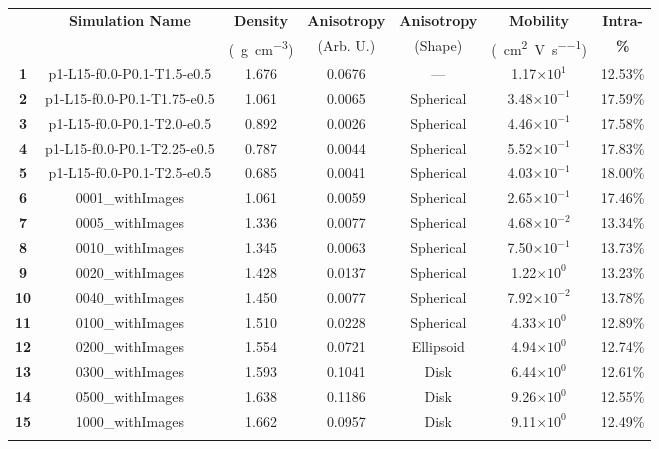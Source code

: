\documentclass[12pt]{article}
\def\mobunits{\square\centi\meter\per\volt\per\second}
\def\gcm{\gram\per\cubic\centi\meter}
\def\ccg{\cellcolor{gray}}
\begin{document}
\begin{center}
\begin{tabular}{| c | c | c | c | c | c | c |}
\hline
\rule{0pt}{2.5ex} 
\multirow{2}{*}{\textbf{ID}}&\multirow{2}{*}{\textbf{Simulation Name}}&\textbf{Density}&\textbf{Anisotropy}&\textbf{Anisotropy}&\textbf{Mobility}&\textbf{Intra-}\\
                            &&(\SI{}{\gcm})&(Arb. U.)&(Shape)&(\SI{}{\mobunits})&\textbf{\%}\\
\hhline{|=======|}
\textbf{\ccg1}&\rule{0pt}{2.5ex}\ccg p1-L15-f0.0-P0.1-T1.5-e0.5&\ccg 1.676&\ccg 0.0676&\ccg ---&\ccg1.17$\times 10^{1}$&\ccg12.53\%\\
\textbf{2}&\rule{0pt}{2.5ex}p1-L15-f0.0-P0.1-T1.75-e0.5&1.061&0.0065&Spherical&3.48$\times 10^{-1}$&17.59\%\\
\textbf{\ccg3}&\rule{0pt}{2.5ex}\ccg p1-L15-f0.0-P0.1-T2.0-e0.5&\ccg 0.892&\ccg 0.0026&\ccg Spherical&\ccg4.46$\times 10^{-1}$&\ccg17.58\%\\
\textbf{4}&\rule{0pt}{2.5ex}p1-L15-f0.0-P0.1-T2.25-e0.5&0.787&0.0044&Spherical&5.52$\times 10^{-1}$&17.83\%\\
\textbf{\ccg5}&\rule{0pt}{2.5ex}\ccg p1-L15-f0.0-P0.1-T2.5-e0.5&\ccg 0.685&\ccg 0.0041&\ccg Spherical&\ccg4.03$\times 10^{-1}$&\ccg18.00\%\\
\hhline{|=======|}
\textbf{\ccg6}&\rule{0pt}{2.5ex}\ccg 0001\_withImages&\ccg 1.061&\ccg 0.0059&\ccg Spherical&\ccg2.65$\times 10^{-1}$&\ccg17.46\%\\
\textbf{7}&\rule{0pt}{2.5ex}0005\_withImages&1.336&0.0077&Spherical&4.68$\times 10^{-2}$&13.34\%\\
\textbf{\ccg8}&\rule{0pt}{2.5ex}\ccg 0010\_withImages&\ccg 1.345&\ccg 0.0063&\ccg Spherical&\ccg7.50$\times 10^{-1}$&\ccg13.73\%\\
\textbf{9}&\rule{0pt}{2.5ex}0020\_withImages&1.428&0.0137&Spherical&1.22$\times 10^{0}$&13.23\%\\
\textbf{\ccg10}&\rule{0pt}{2.5ex}\ccg 0040\_withImages&\ccg 1.450&\ccg 0.0077&\ccg Spherical&\ccg7.92$\times 10^{-2}$&\ccg13.78\%\\
\textbf{11}&\rule{0pt}{2.5ex}0100\_withImages&1.510&0.0228&Spherical&4.33$\times 10^{0}$&12.89\%\\
\textbf{\ccg12}&\rule{0pt}{2.5ex}\ccg 0200\_withImages&\ccg 1.554&\ccg 0.0721&\ccg Ellipsoid&\ccg4.94$\times 10^{0}$&\ccg12.74\%\\
\textbf{13}&\rule{0pt}{2.5ex}0300\_withImages&1.593&0.1041&Disk&6.44$\times 10^{0}$&12.61\%\\
\textbf{\ccg14}&\rule{0pt}{2.5ex}\ccg 0500\_withImages&\ccg 1.638&\ccg 0.1186&\ccg Disk&\ccg9.26$\times 10^{0}$&\ccg12.55\%\\
\textbf{15}&\rule{0pt}{2.5ex}1000\_withImages&1.662&0.0957&Disk&9.11$\times 10^{0}$&12.49\%\\
\hhline{-------}
\end{tabular}\label{table:mob}
\end{center}
\end{document}
